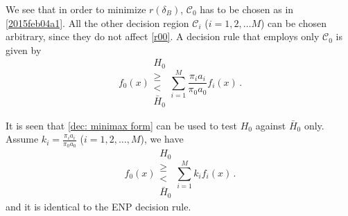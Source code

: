 We see that in order to minimize $r(\delta_B)$, $\mathcal{C}_0$ has to be chosen as in \eqref{2015feb04a1}. All the other decision region $\mathcal{C}_i$ ($i = 1, 2, \dots M$) can be chosen arbitrary, since they do not affect \eqref{r00}. A decision rule that employs only $\mathcal{C}_0$ is given by  
\begin{equation}
\label{dec: minimax form}
f_0(x) \substack{H_0 \\ \geq \\ < \\ \bar{H}_0} \sum_{i=1}^{M}\frac{\pi_ia_i}{\pi_0a_0}f_i(x)\,.
\end{equation}

It is seen that \eqref{dec: minimax form} can be used to test $H_0$ against $\bar{H}_0$ only. Assume $k_i = \frac{\pi_ia_i}{\pi_0a_0}$ ($i = 1, 2, \dots, M$),  we have  
\begin{equation}
\label{dec: bay ney}
f_0(x) \substack{H_0 \\ \geq \\ < \\ \bar{H}_0} \sum_{i=1}^{M}k_if_i(x)\,. 
\end{equation}
and it is identical to the ENP decision rule. 
